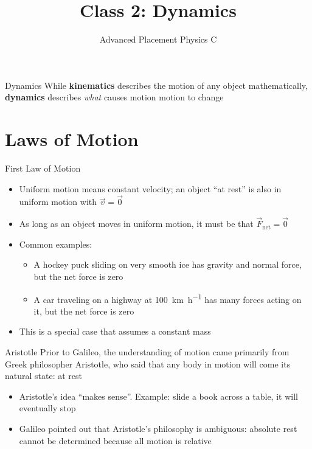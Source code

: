 \documentclass[12pt,compress,aspectratio=169]{beamer}
\title{Class 2: Dynamics}
\subtitle{Advanced Placement Physics C}
\begin{document}
\begin{frame}
  \maketitle
\end{frame}



\begin{frame}{Dynamics}
  While \textbf{kinematics} describes the motion of any object mathematically,
  \textbf{dynamics} describes \emph{what} causes motion motion to change
\end{frame}



\section{Laws of Motion}

\begin{frame}{First Law of Motion}
  \begin{center}
  \end{center}
  \begin{itemize}
  \item Uniform motion means constant velocity; an object ``at rest'' is also
    in uniform motion with $\vec v=\vec 0$
  \item As long as an object moves in uniform motion, it must be that
    $\vec F_\text{net}=\vec 0$
  \item Common examples:
    \begin{itemize}
    \item A hockey puck sliding on very smooth ice has gravity and normal
      force, but the net force is zero
    \item A car traveling on a highway at \SI{100}{\kilo\metre\per\hour}
      has many forces acting on it, but the net force is zero 
    \end{itemize}
  \item{\color{red!80!black}This is a special case that assumes a constant
    mass}
  \end{itemize}
\end{frame}

\begin{frame}{Aristotle}
  Prior to Galileo, the understanding of motion came primarily from Greek
  philosopher Aristotle, who said that any body in motion will come its
  natural state: at rest
  \begin{itemize}
  \item Aristotle's idea ``makes sense''. Example: slide a book across a table,
    it will eventually stop
  \item Galileo pointed out that Aristotle's philosophy is ambiguous: absolute
    rest cannot be determined because all motion is relative
  \end{itemize}
\end{frame}
\end{document}
